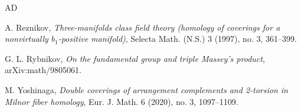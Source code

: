 \documentclass[12pt,leqno,twoside]{amsart}
\theoremstyle{plain}
\theoremstyle{definition}
\begin{document}
\begin{thebibliography}{AD}



 A. Reznikov, {\it Three-manifolds class field theory (homology of coverings for a nonvirtually $b_1$-positive manifold)}, Selecta Math. (N.S.) 3 (1997), no. 3, 361--399.

  G. L. Rybnikov, {\it  On the fundamental group and triple Massey's product}, arXiv:math/9805061.







 M. Yoshinaga, {\it  Double coverings of arrangement complements and 2-torsion in Milnor fiber homology}, Eur. J. Math. 6 (2020), no. 3, 1097--1109.


\end{thebibliography}
\end{document}
